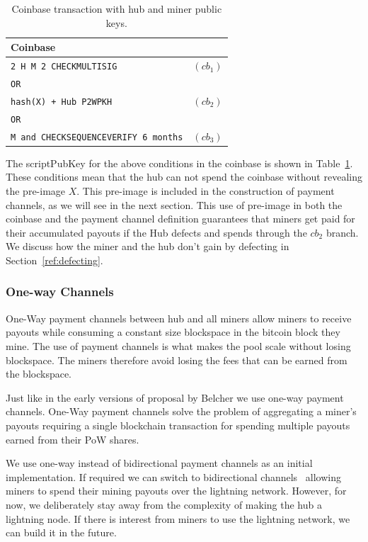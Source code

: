 \documentclass{article}
\begin{document}
\begin{table}
  \centering
  \begin{tabular}{ lr }
    \bfseries Coinbase \\
    \midrule
    \verb|2 H M 2 CHECKMULTISIG| & $(cb_1)$ \\
    \verb|OR| \\
    \verb|hash(X) + Hub P2WPKH| & $(cb_2)$ \\
    \verb|OR| \\
    \verb|M and CHECKSEQUENCEVERIFY 6 months| & $(cb_3)$\\ 
    \midrule
  \end{tabular}
  \caption{Coinbase transaction with hub and miner public keys.}\label{table:coinbase}
\end{table}

The scriptPubKey for the above conditions in the coinbase is shown in
Table~\ref{table:coinbase}. These conditions mean that the hub can not
spend the coinbase without revealing the pre-image $X$. This pre-image
is included in the construction of payment channels, as we will see in
the next section. This use of pre-image in both the coinbase and the
payment channel definition guarantees that miners get paid for their
accumulated payouts if the Hub defects and spends through the $cb_2$
branch. We discuss how the miner and the hub don't gain by defecting
in Section~\ref{ref:defecting}.

\subsubsection{One-way Channels}

One-Way payment channels between hub and all miners allow miners to
receive payouts while consuming a constant size blockspace in the
bitcoin block they mine. The use of payment channels is what makes the
pool scale without losing blockspace. The miners therefore avoid
losing the fees that can be earned from the blockspace.

Just like in the early versions of proposal by Belcher we use one-way
payment channels. One-Way payment channels solve the problem of
aggregating a miner's payouts requiring a single blockchain
transaction for spending multiple payouts earned from their PoW
shares.

We use one-way instead of bidirectional payment channels as an initial
implementation. If required we can switch to bidirectional
channels~\cite{poon2016bitcoin} allowing miners to spend their mining
payouts over the lightning network. However, for now, we deliberately
stay away from the complexity of making the hub a lightning node. If
there is interest from miners to use the lightning network, we can
build it in the future.
\end{document}

